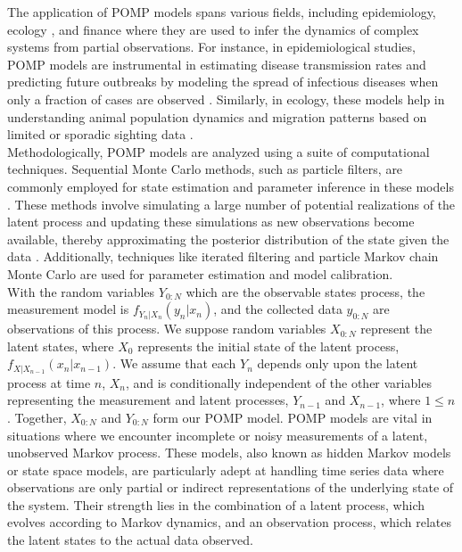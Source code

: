 \documentclass[12pt]{article}
\begin{document}
The application of POMP models spans various fields, including epidemiology, ecology  \cite{king2022markov}, and finance \cite{welton2005estimation} where they are used to infer the dynamics of complex systems from partial observations. For instance, in epidemiological studies, POMP models are instrumental in estimating disease transmission rates and predicting future outbreaks by modeling the spread of infectious diseases when only a fraction of cases are observed \cite{xue2020data}. Similarly, in ecology, these models help in understanding animal population dynamics and migration patterns based on limited or sporadic sighting data \cite{wood2001partially}.\\

Methodologically, POMP models are analyzed using a suite of computational techniques. Sequential Monte Carlo methods, such as particle filters, are commonly employed for state estimation and parameter inference in these models \cite{bhadra2011malaria}. These methods involve simulating a large number of potential realizations of the latent process and updating these simulations as new observations become available, thereby approximating the posterior distribution of the state given the data \cite{King2016}. Additionally, techniques like iterated filtering and particle Markov chain Monte Carlo are used for parameter estimation and model calibration.\\

With the random variables $Y_{0:N}$ which are the observable states process, the measurement model is $f_{Y_n|X_n}(y_n|x_n)$, and the collected data $y_{0:N}$ are observations of this process. We suppose random variables $X_{0:N}$ represent the latent states, where $X_0$ represents the initial state of the latent process, $f_{X|X_{n-1}}(x_n|x_{n-1})$. We assume that each $Y_n$ depends only upon the latent process at time $n$, $X_n$, and is conditionally independent of the other variables representing the measurement and latent processes, $Y_{n-1}$ and $X_{n-1}$, where $1 \leq n$. Together, $X_{0:N}$ and $Y_{0:N}$ form our POMP model. POMP models are vital in situations where we encounter incomplete or noisy measurements of a latent, unobserved Markov process. These models, also known as hidden Markov models or state space models, are particularly adept at handling time series data where observations are only partial or indirect representations of the underlying state of the system. Their strength lies in the combination of a latent process, which evolves according to Markov dynamics, and an observation process, which relates the latent states to the actual data observed.\\
\end{document}
